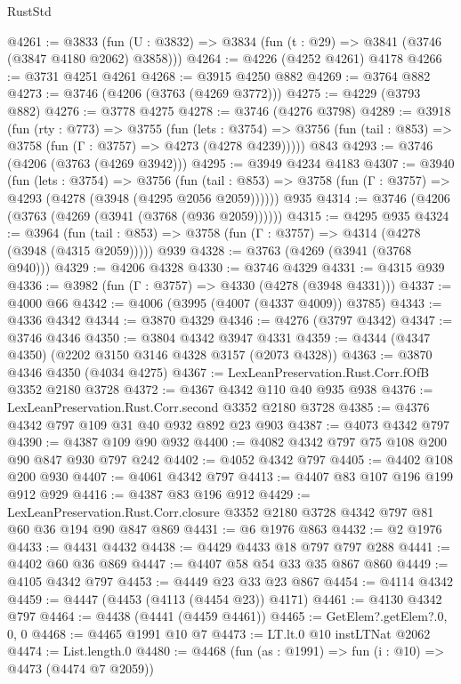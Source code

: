 \begin{lexlean}{RustStd}
\begin{coremodule}
@4261 := @3833 (fun (U : @3832) => @3834 (fun (t : @29) => @3841 (@3746 (@3847 @4180 @2062) @3858)))
@4264 := @4226 (@4252 @4261) @4178
@4266 := @3731 @4251 @4261
@4268 := @3915 @4250 @882
@4269 := @3764 @882
@4273 := @3746 (@4206 (@3763 (@4269 @3772)))
@4275 := @4229 (@3793 @882)
@4276 := @3778 @4275
@4278 := @3746 (@4276 @3798)
@4289 := @3918
    (fun (rty : @773) =>
    @3755
      (fun (lets : @3754) =>
      @3756 (fun (tail : @853) => @3758 (fun (Γ : @3757) => @4273 (@4278 @4239)))))
    @843
@4293 := @3746 (@4206 (@3763 (@4269 @3942)))
@4295 := @3949 @4234 @4183
@4307 := @3940
    (fun (lets : @3754) =>
    @3756
      (fun (tail : @853) => @3758 (fun (Γ : @3757) => @4293 (@4278 (@3948 (@4295 @2056 @2059))))))
    @935
@4314 := @3746 (@4206 (@3763 (@4269 (@3941 (@3768 (@936 @2059))))))
@4315 := @4295 @935
@4324 := @3964
    (fun (tail : @853) => @3758 (fun (Γ : @3757) => @4314 (@4278 (@3948 (@4315 @2059)))))
    @939
@4328 := @3763 (@4269 (@3941 (@3768 @940)))
@4329 := @4206 @4328
@4330 := @3746 @4329
@4331 := @4315 @939
@4336 := @3982 (fun (Γ : @3757) => @4330 (@4278 (@3948 @4331)))
@4337 := @4000 @66
@4342 := @4006 (@3995 (@4007 (@4337 @4009)) @3785)
@4343 := @4336 @4342
@4344 := @3870 @4329
@4346 := @4276 (@3797 @4342)
@4347 := @3746 @4346
@4350 := @3804 @4342 @3947 @4331
@4359 := @4344 (@4347 @4350) (@2202 @3150 @3146 @4328 @3157 (@2073 @4328))
@4363 := @3870 @4346 @4350 (@4034 @4275)
@4367 := LexLeanPreservation.Rust.Corr.fOfB @3352 @2180 @3728
@4372 := @4367 @4342 @110 @40 @935 @938
@4376 := LexLeanPreservation.Rust.Corr.second @3352 @2180 @3728
@4385 := @4376 @4342 @797 @109 @31 @40 @932 @892 @23 @903
@4387 := @4073 @4342 @797
@4390 := @4387 @109 @90 @932
@4400 := @4082 @4342 @797 @75 @108 @200 @90 @847 @930 @797 @242
@4402 := @4052 @4342 @797
@4405 := @4402 @108 @200 @930
@4407 := @4061 @4342 @797
@4413 := @4407 @83 @107 @196 @199 @912 @929
@4416 := @4387 @83 @196 @912
@4429 := LexLeanPreservation.Rust.Corr.closure
    @3352
    @2180
    @3728
    @4342
    @797
    @81
    @60
    @36
    @194
    @90
    @847
    @869
@4431 := @6 @1976 @863
@4432 := @2 @1976
@4433 := @4431 @4432
@4438 := @4429 @4433 @18 @797 @797 @288
@4441 := @4402 @60 @36 @869
@4447 := @4407 @58 @54 @33 @35 @867 @860
@4449 := @4105 @4342 @797
@4453 := @4449 @23 @33 @23 @867
@4454 := @4114 @4342
@4459 := @4447 (@4453 (@4113 (@4454 @23)) @4171)
@4461 := @4130 @4342 @797
@4464 := @4438 (@4441 (@4459 @4461))
@4465 := GetElem?.getElem?.{0, 0, 0}
@4468 := @4465 @1991 @10 @7
@4473 := LT.lt.{0} @10 instLTNat @2062
@4474 := List.length.{0}
@4480 := @4468 (fun (as : @1991) => fun (i : @10) => @4473 (@4474 @7 @2059))

\end{coremodule}
\end{lexlean}

